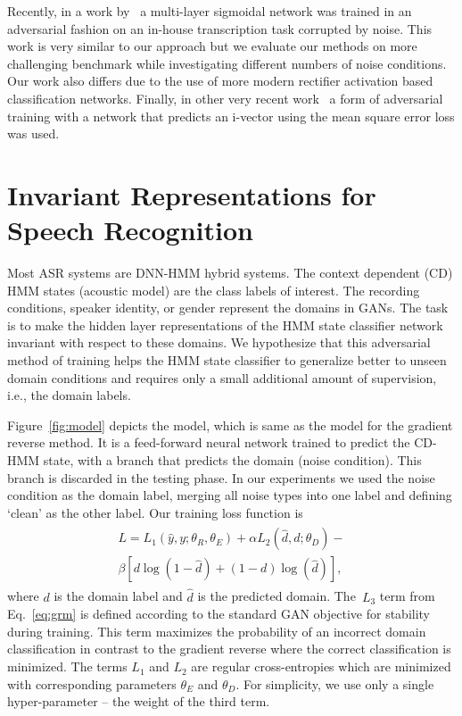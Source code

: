 \documentclass[a4paper]{article}
\begin{document}
    Recently, in a work by~\cite{yusuke2016adversarial} a multi-layer sigmoidal network was trained 
    in an adversarial fashion on an in-house transcription task corrupted by noise.
    This work is very similar to our approach but we evaluate our methods on
    more challenging benchmark while investigating different numbers of noise
    conditions. Our work also differs due to the use of more modern rectifier
    activation based classification networks.
    Finally, in other very recent work~\cite{saon2017english} a form of adversarial training with a network
    that predicts an i-vector using the mean square error loss was used.

\section{Invariant Representations for Speech Recognition}
\label{sec:invariant-speech}

Most ASR systems are DNN-HMM hybrid systems. The context dependent (CD) HMM 
states (acoustic model) are the class labels of interest. The
recording conditions, speaker identity, or gender represent the domains in 
GANs. The task is to make the hidden layer representations of the HMM state classifier network 
invariant with respect to these domains. We hypothesize that this adversarial method of
training helps the HMM state classifier to generalize better to unseen domain conditions and requires only a  
small additional amount of supervision, i.e., the domain labels.  

Figure~\ref{fig:model} depicts the model, which is same as the model for the 
gradient reverse method. It is a feed-forward neural network trained to predict 
the CD-HMM state, with a branch that predicts the domain (noise condition). This 
branch is discarded in the testing phase. In our experiments we
used the noise condition as the domain label, merging all noise types into one label
and defining `clean' as the other label. Our training loss function is  
\begin{align}
    \begin{split}
    L = L_1(\hat{y}, y; \theta_R, \theta_E) + 
    \alpha L_2(\hat{d}, d; \theta_D) -\\
    \beta [d\log(1 - \hat{d}) + (1-d)\log(\hat{d})],
    \end{split}
    \label{eq:our}
\end{align}
where $d$ is the domain label and $\hat{d}$ is the predicted domain.
The~$L_3$ term from Eq.~\ref{eq:grm} is defined according to the standard GAN
objective for stability during training. 
This term maximizes the probability
of an incorrect domain classification in contrast to the gradient reverse where the 
correct classification is minimized.
The terms $L_1$ and $L_2$ are 
regular cross-entropies which are minimized with corresponding parameters $\theta_E$ and $\theta_D$.
For simplicity, we use only a single hyper-parameter -- the weight of the third term.
\end{document}
